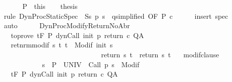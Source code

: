 \begin{isabellebody}
\ \ \isamarkupfalse%
\isanewline
\ \ \isamarkupfalse%
\ P\ {\isacharequal}\ this\isanewline
\ \ \isamarkupfalse%
\ {\isacharquery}thesis\isanewline
\ \ \ \ \isamarkupfalse%
\ {\isacharminus}\isanewline
\ \ \ \ \isamarkupfalse%
\ {\isacharparenleft}rule\ DynProcStaticSpec\ {\isacharbrackleft}\ S{\isacharequal}{\isachardoublequoteopen}{\isacharbraceleft}s{\isachardot}\ p\ s\ {\isacharequal}\ q{\isacharbraceright}{\isachardoublequoteclose}{\isacharcomma}simplified{\isacharcomma}\ OF\ P\ c{\isacharbrackright}{\isacharparenright}\isanewline
\ \ \ \ \isamarkupfalse%
\ {\isacharparenleft}insert\ spec{\isacharparenright}\isanewline
\ \ \ \ \isamarkupfalse%
\ auto\isanewline
\ \ \ \ \isamarkupfalse%
\isanewline
{}\isamarkupfalse%
%
\endisatagproof
{\isafoldproof}%
%
\isadelimproof
\isanewline
%
\endisadelimproof
\isanewline
{}\isamarkupfalse%
\ DynProcModifyReturnNoAbr{\isacharcolon}\ \isanewline
\ \ \ to{\isacharunderscore}prove{\isacharcolon}\ {\isachardoublequoteopen}{\isasymGamma}{\isacharcomma}{\isasymTheta}{\isasymturnstile}\isactrlsub t\isactrlbsub {\isacharslash}F\isactrlesub \ P\ {\isacharparenleft}dynCall\ init\ p\ return{\isacharprime}\ c{\isacharparenright}\ Q{\isacharcomma}A{\isachardoublequoteclose}\isanewline
\ \ \ ret{\isacharunderscore}nrm{\isacharunderscore}modif{\isacharcolon}\ {\isachardoublequoteopen}{\isasymforall}s\ t{\isachardot}\ t\ {\isasymin}\ {\isacharparenleft}Modif\ {\isacharparenleft}init\ s{\isacharparenright}{\isacharparenright}\ \isanewline
\ \ \ \ \ \ \ \ \ \ \ \ \ \ \ \ \ \ \ \ \ \ \ \ \ \ \ \ {\isasymlongrightarrow}\ return{\isacharprime}\ s\ t\ {\isacharequal}\ return\ s\ t{\isachardoublequoteclose}\isanewline
\ \ \ modif{\isacharunderscore}clause{\isacharcolon}\ \isanewline
\ \ \ \ \ \ \ \ \ \ \ \ {\isachardoublequoteopen}{\isasymforall}s\ {\isasymin}\ P{\isachardot}\ {\isasymforall}{\isasymsigma}{\isachardot}\ {\isasymGamma}{\isacharcomma}{\isasymTheta}{\isasymturnstile}\isactrlbsub {\isacharslash}UNIV\isactrlesub \ {\isacharbraceleft}{\isasymsigma}{\isacharbraceright}\ Call\ {\isacharparenleft}p\ s{\isacharparenright}\ \ {\isacharparenleft}Modif\ {\isasymsigma}{\isacharparenright}{\isacharcomma}{\isacharbraceleft}{\isacharbraceright}{\isachardoublequoteclose}\isanewline
\ \ \ {\isachardoublequoteopen}{\isasymGamma}{\isacharcomma}{\isasymTheta}{\isasymturnstile}\isactrlsub t\isactrlbsub {\isacharslash}F\isactrlesub \ P\ {\isacharparenleft}dynCall\ init\ p\ return\ c{\isacharparenright}\ Q{\isacharcomma}A{\isachardoublequoteclose}\isanewline

\end{isabellebody}
